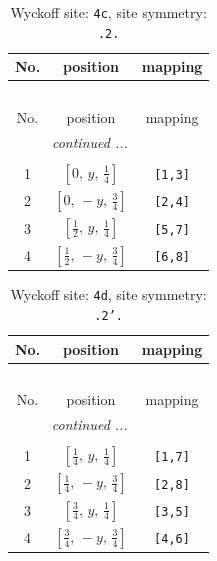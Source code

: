 \documentclass[fleqn,8pt]{jsarticle}
\begin{document}
\renewcommand{\arraystretch}{1.2}
\begin{longtable}{ccc}
\caption{Wyckoff site: {\tt 4c}, site symmetry: {\tt .2.}}
 \\
 \hline \hline
No. & position & mapping \\ \hline \endfirsthead

\multicolumn{2}{l}{\tablename\ \thetable{}} \\
 \hline \hline
No. & position & mapping \\ \hline \endhead

 \hline \hline
\multicolumn{2}{r}{\footnotesize\it continued ...} \\ \endfoot

 \hline \hline
\multicolumn{2}{r}{} \\ \endlastfoot

1 & $\left[ 0,\, y,\, \frac{1}{4} \right]$ & {\tt [1,3]} \\ \hline
2 & $\left[ 0,\, - y,\, \frac{3}{4} \right]$ & {\tt [2,4]} \\ \hline
3 & $\left[ \frac{1}{2},\, y,\, \frac{1}{4} \right]$ & {\tt [5,7]} \\ \hline
4 & $\left[ \frac{1}{2},\, - y,\, \frac{3}{4} \right]$ & {\tt [6,8]} \\
\end{longtable}
\renewcommand{\arraystretch}{1.2}
\begin{longtable}{ccc}
\caption{Wyckoff site: {\tt 4d}, site symmetry: {\tt .2'.}}
 \\
 \hline \hline
No. & position & mapping \\ \hline \endfirsthead

\multicolumn{2}{l}{\tablename\ \thetable{}} \\
 \hline \hline
No. & position & mapping \\ \hline \endhead

 \hline \hline
\multicolumn{2}{r}{\footnotesize\it continued ...} \\ \endfoot

 \hline \hline
\multicolumn{2}{r}{} \\ \endlastfoot

1 & $\left[ \frac{1}{4},\, y,\, \frac{1}{4} \right]$ & {\tt [1,7]} \\ \hline
2 & $\left[ \frac{1}{4},\, - y,\, \frac{3}{4} \right]$ & {\tt [2,8]} \\ \hline
3 & $\left[ \frac{3}{4},\, y,\, \frac{1}{4} \right]$ & {\tt [3,5]} \\ \hline
4 & $\left[ \frac{3}{4},\, - y,\, \frac{3}{4} \right]$ & {\tt [4,6]} \\
\end{longtable}
\end{document}
